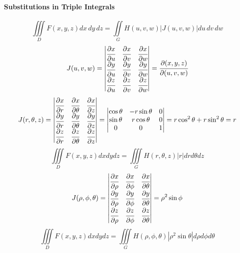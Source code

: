 \documentclass{article}
\begin{document}
            \paragraph{Substitutions in Triple Integrals}
                \[\iiint\limits_DF(x,y,z)dx\,dy\,dz=\iint\limits_GH(u,v,w)|J(u,v,w)|du\,dv\,dw\]
                \[J(u,v,w)=
                \begin{vmatrix}
                    \cfrac{\partial x}{\partial u}&\cfrac{\partial x}{\partial v}&\cfrac{\partial x}{\partial w}\\
                    \cfrac{\partial y}{\partial u}&\cfrac{\partial y}{\partial v}&\cfrac{\partial y}{\partial w}\\
                    \cfrac{\partial z}{\partial u}&\cfrac{\partial z}{\partial v}&\cfrac{\partial z}{\partial w}\\
                \end{vmatrix}=\cfrac{\partial(x,y,z)}{\partial(u,v,w)}\]
                \[J(r,\theta,z)=
                \begin{vmatrix}
                    \cfrac{\partial x}{\partial r}&\cfrac{\partial x}{\partial \theta}&\cfrac{\partial x}{\partial z}\\
                    \cfrac{\partial y}{\partial r}&\cfrac{\partial y}{\partial \theta}&\cfrac{\partial y}{\partial z}\\
                    \cfrac{\partial z}{\partial r}&\cfrac{\partial z}{\partial \theta}&\cfrac{\partial z}{\partial z}\\
                \end{vmatrix}=
                \begin{vmatrix}
                    \cos\theta&-r\sin\theta&0\\
                    \sin\theta&r\cos\theta&0\\
                    0&0&1\\
                \end{vmatrix}=
                r\cos^2\theta+r\sin^2\theta=r
                \]
                \[\iiint\limits_DF(x,y,z)dxdydz=\iiint\limits_GH(r,\theta,z)|r|drd\theta dz\]
                \[J(\rho,\phi,\theta)=
                \begin{vmatrix}
                    \cfrac{\partial x}{\partial \rho}&\cfrac{\partial x}{\partial \phi}&\cfrac{\partial x}{\partial \theta}\\
                    \cfrac{\partial y}{\partial \rho}&\cfrac{\partial y}{\partial \phi}&\cfrac{\partial y}{\partial \theta}\\
                    \cfrac{\partial z}{\partial \rho}&\cfrac{\partial z}{\partial \phi}&\cfrac{\partial z}{\partial \theta}\\
                \end{vmatrix}=
                \rho^2\sin\phi\]
                \[\iiint\limits_DF(x,y,z)dxdydz=\iiint\limits_GH(\rho,\phi,\theta)|\rho^2\sin\theta|d\rho d\phi d\theta\]
        
\end{document}
